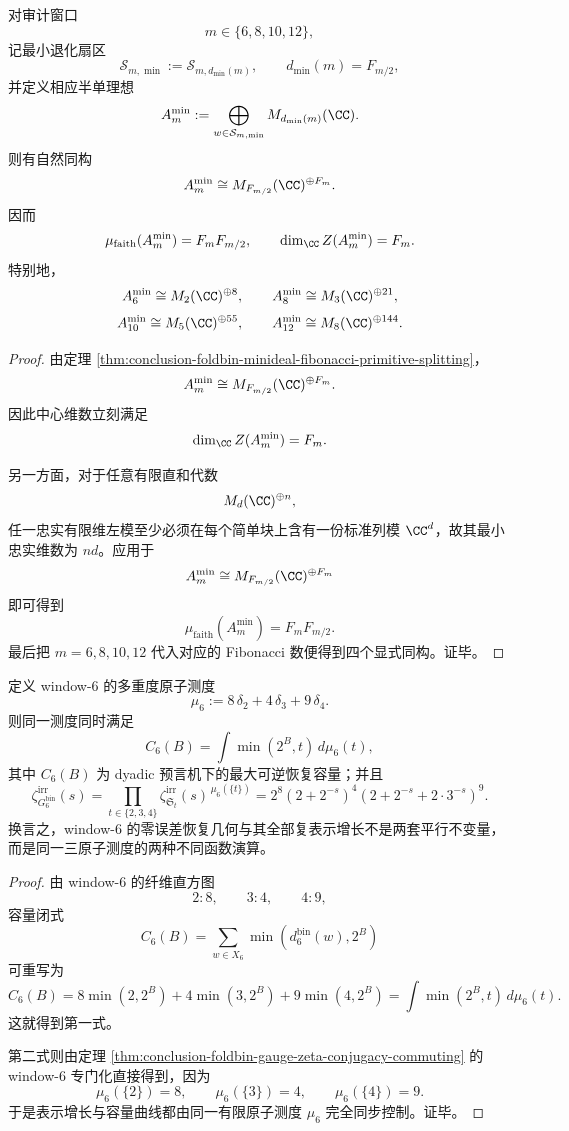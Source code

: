 \begin{theorem}\label{thm:conclusion-audited-even-window-fibonacci-minideal-faithful-center}
对审计窗口
\[
m\in\{6,8,10,12\},
\]
记最小退化扇区
\[
\mathcal S_{m,\min}:=\mathcal S_{m,d_{\min}(m)},
\qquad
d_{\min}(m)=F_{m/2},
\]
并定义相应半单理想
\[
A_m^{\min}
:=
\bigoplus_{w\in \mathcal S_{m,\min}} M_{d_{\min}(m)}(\CC).
\]
则有自然同构
\[
A_m^{\min}\cong M_{F_{m/2}}(\CC)^{\oplus F_m}.
\]
因而
\[
\mu_{\mathrm{faith}}(A_m^{\min})=F_mF_{m/2},
\qquad
\dim_{\CC}Z(A_m^{\min})=F_m.
\]
特别地，
\[
A_6^{\min}\cong M_2(\CC)^{\oplus 8},\qquad
A_8^{\min}\cong M_3(\CC)^{\oplus 21},
\]
\[
A_{10}^{\min}\cong M_5(\CC)^{\oplus 55},\qquad
A_{12}^{\min}\cong M_8(\CC)^{\oplus 144}.
\]
\end{theorem}
\begin{proof}
由定理 \ref{thm:conclusion-foldbin-minideal-fibonacci-primitive-splitting}，
\[
A_m^{\min}\cong M_{F_{m/2}}(\CC)^{\oplus F_m}.
\]
因此中心维数立刻满足
\[
\dim_{\CC}Z(A_m^{\min})=F_m.
\]

另一方面，对于任意有限直和代数
\[
M_d(\CC)^{\oplus n},
\]
任一忠实有限维左模至少必须在每个简单块上含有一份标准列模 \(\CC^d\)，故其最小忠实维数为 \(nd\)。应用于
\[
A_m^{\min}\cong M_{F_{m/2}}(\CC)^{\oplus F_m}
\]
即可得到
\[
\mu_{\mathrm{faith}}(A_m^{\min})=F_mF_{m/2}.
\]
最后把 \(m=6,8,10,12\) 代入对应的 Fibonacci 数便得到四个显式同构。证毕。
\end{proof}

\begin{theorem}\label{thm:conclusion-window6-threeatomic-measure-capacity-representation}
定义 window-\(6\) 的多重度原子测度
\[
\mu_6:=8\,\delta_2+4\,\delta_3+9\,\delta_4.
\]
则同一测度同时满足
\[
C_6(B)=\int \min(2^B,t)\,d\mu_6(t),
\]
其中 \(C_6(B)\) 为 dyadic 预言机下的最大可逆恢复容量；并且
\[
\zeta_{G_6^{\mathrm{bin}}}^{\mathrm{irr}}(s)
=
\prod_{t\in\{2,3,4\}}
\zeta_{\mathfrak S_t}^{\mathrm{irr}}(s)^{\,\mu_6(\{t\})}
=
2^8(2+2^{-s})^4(2+2^{-s}+2\cdot 3^{-s})^9.
\]
换言之，window-\(6\) 的零误差恢复几何与其全部复表示增长不是两套平行不变量，而是同一三原子测度的两种不同函数演算。
\end{theorem}
\begin{proof}
由 window-\(6\) 的纤维直方图
\[
2:8,\qquad 3:4,\qquad 4:9,
\]
容量闭式
\[
C_6(B)=\sum_{w\in X_6}\min(d_6^{\mathrm{bin}}(w),2^B)
\]
可重写为
\[
C_6(B)=8\min(2,2^B)+4\min(3,2^B)+9\min(4,2^B)
=
\int \min(2^B,t)\,d\mu_6(t).
\]
这就得到第一式。

第二式则由定理 \ref{thm:conclusion-foldbin-gauge-zeta-conjugacy-commuting} 的 window-\(6\) 专门化直接得到，因为
\[
\mu_6(\{2\})=8,\qquad
\mu_6(\{3\})=4,\qquad
\mu_6(\{4\})=9.
\]
于是表示增长与容量曲线都由同一有限原子测度 \(\mu_6\) 完全同步控制。证毕。
\end{proof}

